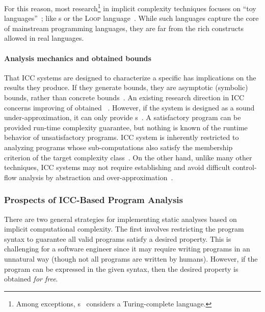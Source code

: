 \noindent For this reason, most research\footnote{
Among exceptions, s~\cite{marion2000} considers a
Turing-complete language.} in implicit complexity
techniques focuses on \enquote{toy languages}~\cite{moyen2017,rubiano17}; like
s or the \textsc{Loop} language~\cite{kristiansen2005}.
While such languages capture the core of mainstream programming languages, they
are far from the rich constructs allowed in real languages.

\paragraph*{Analysis mechanics and obtained bounds}
That ICC systems are designed to characterize a specific  has implications on the results they produce. If they generate bounds,
they are asymptotic (symbolic) bounds, rather than concrete
bounds~\cite{baillot2019}. An existing research direction in ICC concerns
improving  of obtained ~\cite{benamram2020}.
However, if the system is designed as a sound
under-approximation, it can only provide s~\cite[p.
119]{moyen2017}. A satisfactory program can be provided run-time complexity
guarantee, but nothing is known of the runtime behavior of unsatisfactory
programs. ICC system is inherently restricted to analyzing programs whose
sub-computations also satisfy the membership criterion of the target complexity
class~\cite{baillot2019}. On the other hand, unlike many other  techniques, ICC systems may not require establishing
 and avoid difficult control-flow analysis by abstraction and
over-approximation~\cite{jones2009}.

\subsubsection{Prospects of ICC-Based Program Analysis}

There are two general strategies for implementing static analyses based on
implicit computational complexity. The first involves restricting the program
syntax to guarantee all valid programs satisfy a desired property. This is
challenging for a software engineer since it may require writing programs in an
unnatural way (though not all programs are written by humans). However, if the
program can be expressed in the given syntax, then the desired property is
obtained \emph{for free}.

